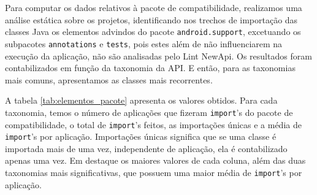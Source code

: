Para computar os dados relativos à pacote de compatibilidade, realizamos uma análise
estática sobre os projetos, identificando nos trechos de importação das classes Java
os elementos advindos do pacote \texttt{android.support}, excetuando os subpacotes
\texttt{annotations} e \texttt{tests}, pois estes além de não influenciarem na execução
da aplicação, não são analisadas pelo Lint NewApi. Os resultados foram contabilizados
em função da taxonomia da API. E então, para as taxonomias mais comuns, apresentamos
as classes mais recorrentes.

A tabela \ref{tab:elementos_pacote} apresenta os valores obtidos. Para cada taxonomia,
temos o número de aplicações que fizeram \texttt{import}’s do pacote de compatibilidade,
o total de \texttt{import}’s feitos, as importações únicas e a média de \texttt{import}’s 
por aplicação. Importações únicas significa que se uma classe é importada mais de uma vez, 
independente de aplicação, ela é contabilizado apenas uma vez. Em destaque os maiores 
valores de cada coluna, além das duas taxonomias mais significativas, que possuem uma
 maior média de \texttt{import}’s por aplicação.

